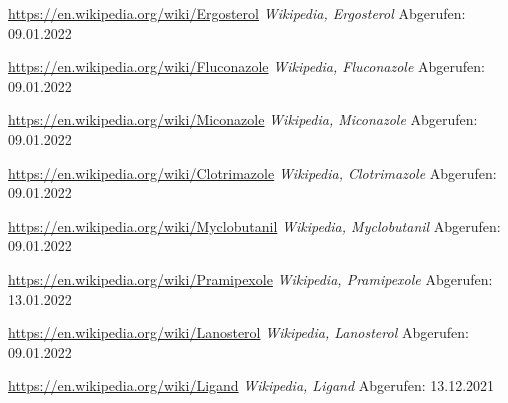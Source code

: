 \begin{thebibliography}{1}
\url{https://en.wikipedia.org/wiki/Ergosterol} \emph{Wikipedia, Ergosterol}
Abgerufen: 09.01.2022

\url{https://en.wikipedia.org/wiki/Fluconazole} \emph{Wikipedia, Fluconazole}
Abgerufen: 09.01.2022

\url{https://en.wikipedia.org/wiki/Miconazole} \emph{Wikipedia, Miconazole}
Abgerufen: 09.01.2022

\url{https://en.wikipedia.org/wiki/Clotrimazole} \emph{Wikipedia, Clotrimazole}
Abgerufen: 09.01.2022

\url{https://en.wikipedia.org/wiki/Myclobutanil} \emph{Wikipedia, Myclobutanil}
Abgerufen: 09.01.2022

\url{https://en.wikipedia.org/wiki/Pramipexole} \emph{Wikipedia, Pramipexole}
Abgerufen: 13.01.2022

\url{https://en.wikipedia.org/wiki/Lanosterol} \emph{Wikipedia, Lanosterol}
Abgerufen: 09.01.2022

\url{https://en.wikipedia.org/wiki/Ligand} \emph{Wikipedia, Ligand}
Abgerufen: 13.12.2021

\end{thebibliography}